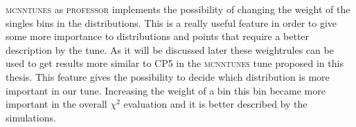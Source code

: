 \textsc{mcnntunes} as \textsc{professor} implements the possibility of changing the weight of the singles bins in the distributions. This is a really useful feature in order to give some more importance to distributions and points that require a better description by the tune. As it will be discussed later these weightrules can be used  to get results more similar to CP5 in the \textsc{mcnntunes} tune proposed in this thesis. 
This feature gives the possibility to decide which distribution is more important in our tune.
Increasing the weight of a bin this bin became more important in the overall $\chi^2$ evaluation and it is better described by the simulations. 
%


